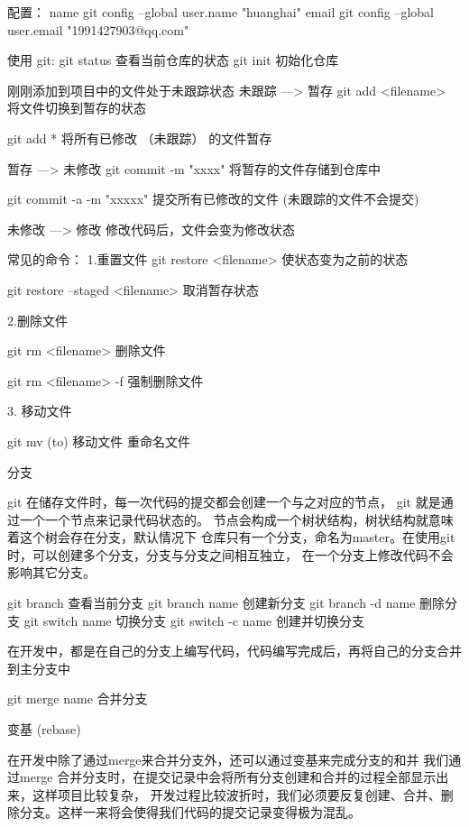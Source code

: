   配置：
    name
         git config --global user.name "huanghai"
    email
         git config --global user.email "1991427903@qq.com"

使用 git:
    git status
        查看当前仓库的状态
    git init
        初始化仓库

    刚刚添加到项目中的文件处于未跟踪状态
        未跟踪 ---> 暂存
            git add <filename> 将文件切换到暂存的状态

            git add * 将所有已修改 （未跟踪） 的文件暂存

        暂存 ---> 未修改
            git commit -m "xxxx"  将暂存的文件存储到仓库中

            git commit -a -m "xxxxx"   提交所有已修改的文件     (未跟踪的文件不会提交)

        未修改 ---> 修改 
            修改代码后，文件会变为修改状态

        常见的命令：
        1.重置文件
            git restore <filename>   使状态变为之前的状态

            git restore --staged <filename>  取消暂存状态

        2.删除文件 

            git rm  <filename>  删除文件

            git rm  <filename> -f  强制删除文件

        3. 移动文件

            git mv  (to)  移动文件 重命名文件

        分支

        git 在储存文件时，每一次代码的提交都会创建一个与之对应的节点，
        git 就是通过一个一个节点来记录代码状态的。
        节点会构成一个树状结构，树状结构就意味着这个树会存在分支，默认情况下
        仓库只有一个分支，命名为master。在使用git 时，可以创建多个分支，分支与分支之间相互独立，
        在一个分支上修改代码不会影响其它分支。

        git branch 查看当前分支
        git branch name  创建新分支
        git branch -d name   删除分支
        git switch name  切换分支
        git switch -c name      创建并切换分支

        在开发中，都是在自己的分支上编写代码，代码编写完成后，再将自己的分支合并到主分支中

        git merge name   合并分支

        变基 (rebase)

        在开发中除了通过merge来合并分支外，还可以通过变基来完成分支的和并
        我们通过merge 合并分支时，在提交记录中会将所有分支创建和合并的过程全部显示出来，这样项目比较复杂，
        开发过程比较波折时，我们必须要反复创建、合并、删除分支。这样一来将会使得我们代码的提交记录变得极为混乱。

